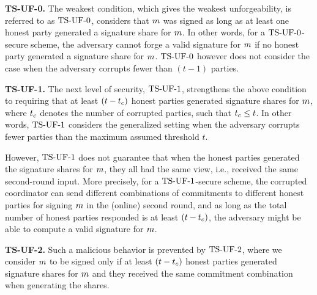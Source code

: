 
\medskip

\textbf{TS-UF-0.} The weakest condition, which gives the weakest unforgeability, is referred to as $\mathrm{TS}\mbox{-}\mathrm{UF}\mbox{-}{0}$,  considers that $m$ was signed as long as at least one honest party generated a signature share for $m$.  In other words, for a $\mathrm{TS}\mbox{-}\mathrm{UF}\mbox{-}{0}$-secure scheme, the adversary cannot forge a valid signature for $m$ if no honest party generated a signature share for $m$.
$\mathrm{TS}\mbox{-}\mathrm{UF}\mbox{-}{0}$ however does not consider the case when the adversary corrupts fewer than $(t-1)$ parties.

\medskip

\textbf{TS-UF-1.} The next level of security, $\mathrm{TS}\mbox{-}\mathrm{UF}\mbox{-}{1}$, strengthens the above condition to requiring that at least  $(t - t_c)$ honest parties generated signature shares for $m$,
where $t_c$ denotes the number of corrupted parties,
such that $t_c \leq t$. 
In other words,
$\mathrm{TS}\mbox{-}\mathrm{UF}\mbox{-}{1}$ considers the generalized setting when the adversary corrupts fewer parties than the maximum assumed threshold $t$.

However, $\mathrm{TS}\mbox{-}\mathrm{UF}\mbox{-}{1}$ does not guarantee that when the honest parties generated the signature shares for $m$, they all had the same view, i.e., received the same second-round input.
More precisely, for a $\mathrm{TS}\mbox{-}\mathrm{UF}\mbox{-}{1}$-secure scheme, the corrupted coordinator can send different combinations of commitments to different honest parties for signing $m$ in the (online) second round,
and as long as the total number of honest parties responded is at least $(t-t_c)$, the adversary might be able to compute a valid signature for $m$.


\medskip

\textbf{TS-UF-2.}
Such a malicious behavior is prevented by $\mathrm{TS}\mbox{-}\mathrm{UF}\mbox{-}{2}$, where
we consider $m$ to be signed only if at least $(t - t_c)$ honest parties generated signature shares for $m$ and they received the same commitment combination when generating the shares.


